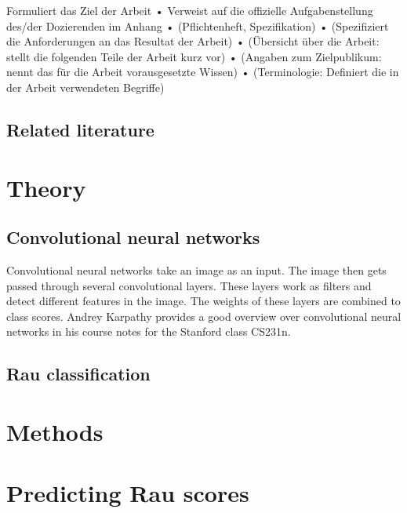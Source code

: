 \documentclass[12pt]{article}
\begin{document}
Formuliert das Ziel der Arbeit • Verweist auf die offizielle Aufgabenstellung des/der Dozierenden im Anhang • (Pflichtenheft, Spezifikation) • (Spezifiziert die Anforderungen an das Resultat der Arbeit) • (Übersicht über die Arbeit: stellt die folgenden Teile der Arbeit kurz vor) • (Angaben zum Zielpublikum: nennt das für die Arbeit vorausgesetzte Wissen) • (Terminologie: Definiert die in der Arbeit verwendeten Begriffe) 

\subsection{Related literature}


\section{Theory}

\subsection{Convolutional neural networks}
\label{subsec:cnn}
Convolutional neural networks take an image as an input. The image then gets passed through several convolutional layers. These layers work as filters and detect different features in the image. The weights of these layers are combined to class scores. Andrey Karpathy provides a good overview over convolutional neural networks in his course notes for the Stanford class CS231n. \cite{cnn}

\subsection{Rau classification}
\label{subsec:rau}

\section{Methods}


\section{Predicting Rau scores}
\end{document}
